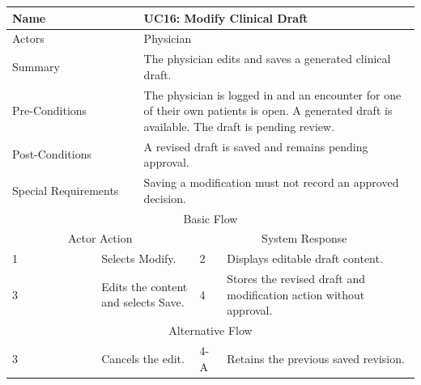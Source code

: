 \begin{reporttable}
\centering
\small
\caption{UC16: Modify Clinical Draft.}
\label{tab:kashaf:uc16}
\begin{tabular}{|p{}|p{}|p{}|p{}|p{}|}
\hline
\multicolumn{2}{|p{\dimexpr0.225\textwidth+2\tabcolsep+\arrayrulewidth\relax}|}{Name} & \multicolumn{3}{p{\dimexpr0.575\textwidth+4\tabcolsep+2\arrayrulewidth\relax}|}{UC16: Modify Clinical Draft} \\ \hline
\multicolumn{2}{|p{\dimexpr0.225\textwidth+2\tabcolsep+\arrayrulewidth\relax}|}{Actors} & \multicolumn{3}{p{\dimexpr0.575\textwidth+4\tabcolsep+2\arrayrulewidth\relax}|}{Physician} \\ \hline
\multicolumn{2}{|p{\dimexpr0.225\textwidth+2\tabcolsep+\arrayrulewidth\relax}|}{Summary} & \multicolumn{3}{p{\dimexpr0.575\textwidth+4\tabcolsep+2\arrayrulewidth\relax}|}{The physician edits and saves a generated clinical draft.} \\ \hline
\multicolumn{2}{|p{\dimexpr0.225\textwidth+2\tabcolsep+\arrayrulewidth\relax}|}{Pre-Conditions} & \multicolumn{3}{p{\dimexpr0.575\textwidth+4\tabcolsep+2\arrayrulewidth\relax}|}{The physician is logged in and an encounter for one of their own patients is open. A generated draft is available. The draft is pending review.} \\ \hline
\multicolumn{2}{|p{\dimexpr0.225\textwidth+2\tabcolsep+\arrayrulewidth\relax}|}{Post-Conditions} & \multicolumn{3}{p{\dimexpr0.575\textwidth+4\tabcolsep+2\arrayrulewidth\relax}|}{A revised draft is saved and remains pending approval.} \\ \hline
\multicolumn{2}{|p{\dimexpr0.225\textwidth+2\tabcolsep+\arrayrulewidth\relax}|}{Special Requirements} & \multicolumn{3}{p{\dimexpr0.575\textwidth+4\tabcolsep+2\arrayrulewidth\relax}|}{Saving a modification must not record an approved decision.} \\ \hline
\multicolumn{5}{|c|}{Basic Flow} \\ \hline
\multicolumn{3}{|c|}{Actor Action} & \multicolumn{2}{c|}{System Response} \\ \hline
1 & \multicolumn{2}{p{\dimexpr0.37\textwidth+2\tabcolsep+\arrayrulewidth\relax}|}{Selects Modify.} & 2 & Displays editable draft content. \\ \hline
3 & \multicolumn{2}{p{\dimexpr0.37\textwidth+2\tabcolsep+\arrayrulewidth\relax}|}{Edits the content and selects Save.} & 4 & Stores the revised draft and modification action without approval. \\ \hline
\multicolumn{5}{|c|}{Alternative Flow} \\ \hline
3 & \multicolumn{2}{p{\dimexpr0.37\textwidth+2\tabcolsep+\arrayrulewidth\relax}|}{Cancels the edit.} & 4-A & Retains the previous saved revision. \\ \hline
\end{tabular}
\end{reporttable}

